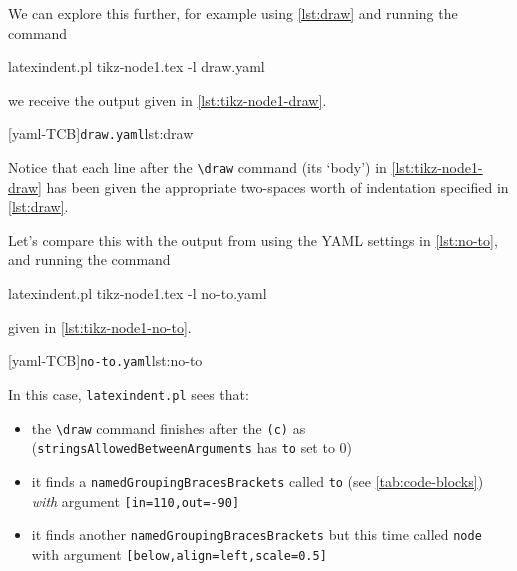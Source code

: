 	We can explore this further, for example using \cref{lst:draw} and running the command
	\begin{commandshell}
latexindent.pl tikz-node1.tex -l draw.yaml  
\end{commandshell}
	we receive the output given in \cref{lst:tikz-node1-draw}.

	\begin{minipage}{.45\textwidth}
	\end{minipage}
	\hfill
	\begin{minipage}{.45\textwidth}
		[yaml-TCB]{\texttt{draw.yaml}}{lst:draw}
	\end{minipage}

	Notice that each line after the \lstinline!\draw! command (its `body') in \cref{lst:tikz-node1-draw} has been given the
	appropriate two-spaces worth of indentation specified in \cref{lst:draw}.

	Let's compare this with the output from using the YAML settings in \cref{lst:no-to}, and running the command
	\begin{commandshell}
latexindent.pl tikz-node1.tex -l no-to.yaml  
\end{commandshell}
	given in \cref{lst:tikz-node1-no-to}.

	\begin{minipage}{.45\textwidth}
	\end{minipage}
	\hfill
	\begin{minipage}{.45\textwidth}
		[yaml-TCB]{\texttt{no-to.yaml}}{lst:no-to}
	\end{minipage}

	In this case, \texttt{latexindent.pl} sees that:
	\begin{itemize}
		\item the \lstinline!\draw! command finishes after the \lstinline!(c)! as (\texttt{stringsAllowedBetweenArguments} has \texttt{to} set to $0$)
		\item it finds a \texttt{namedGroupingBracesBrackets} called \texttt{to} (see \vref{tab:code-blocks}) \emph{with} argument \lstinline![in=110,out=-90]!
		\item it finds another \texttt{namedGroupingBracesBrackets} but this time called \texttt{node} with argument \lstinline![below,align=left,scale=0.5]!
	\end{itemize}

